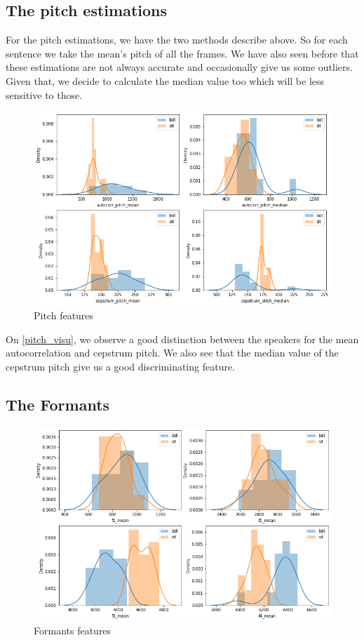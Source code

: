 \documentclass[]{article}
\begin{document}
\subsection{The pitch estimations}

For the pitch estimations, we have the two methods describe above. So for each sentence 
we take the mean's pitch of all the frames. We have also seen before that these estimations are
not always accurate and occasionally give us some outliers. Given that, we decide to calculate
the median value too which will be less sensitive to those.


\begin{figure}[H]
    \centering
    \caption{Pitch features}
    \label{pitch_visu}
    \includegraphics[scale=0.5]{images/pitch_visu.png} 
\end{figure}


On \autoref{pitch_visu}, we observe a good distinction between the speakers for the mean autocorrelation
and cepstrum pitch. We also see that the median value of the cepstrum pitch give us a good
discriminating feature.

\subsection{The Formants}


\begin{figure}[H]
    \centering
    \caption{\label{formants_visu}Formants features}
    \includegraphics[scale=0.5]{images/formants_visu.png}
\end{figure}
\end{document}
